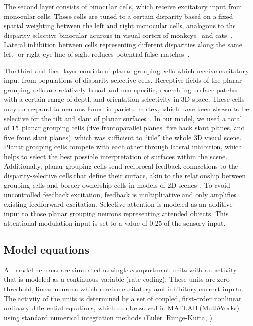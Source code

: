 The second layer consists of binocular cells, which receive excitatory
input from monocular cells. These cells are tuned to a certain disparity based on a fixed spatial weighting between the left and right monocular cells, analogous to the disparity-selective binocular neurons in visual cortex of monkeys~\citep{Poggio_Fischer77, Poggio_Poggio84} and cats~\citep{Bishop_Pettigrew86, Ohzawa_etal90}. Lateral inhibition between cells representing different disparities along the same left- or right-eye line of sight reduces potential false matches~\citep{Marr_Poggio76}.

The third and final layer consists of planar grouping cells which receive excitatory input from populations of disparity-selective
cells. Receptive fields of the planar grouping cells are relatively broad and non-specific, resembling surface patches with a certain range of depth and orientation selectivity in 3D space. These cells may correspond to neurons found in parietal cortex, which have been shown to be selective for the tilt and slant of planar surfaces~\citep{Rosenberg_etal13}. In our model, we used a total of 15~planar grouping cells (\ie five frontoparallel planes, five back slant planes, and five front slant planes), which was sufficient to ``tile'' the whole 3D visual scene. Planar grouping cells compete with each other through lateral inhibition, which helps to select the best possible interpretation of surfaces within the scene. Additionally, planar grouping cells send reciprocal feedback connections to the disparity-selective cells that define their surface, akin to the relationship between grouping cells and border ownership cells in models of 2D scenes~\citep{Craft_etal07,Mihalas_etal11b}.
 To avoid
uncontrolled feedback excitation, feedback is multiplicative and only amplifies existing feedforward excitation. 
Selective attention is modeled as an additive input to those planar grouping neurons representing attended objects. This attentional modulation input is set to a value of 0.25 of the sensory input.

\subsection{Model equations}

All model neurons are simulated as single compartment units with an
activity that is modeled as a continuous variable (rate coding). These
units are zero-threshold, linear neurons which receive excitatory and
inhibitory current inputs. The activity of the units is determined by
a set of coupled, first-order nonlinear ordinary differential equations, which can be solved in MATLAB (MathWorks) using standard numerical integration methods (Euler, Runge-Kutta, \etc) 

